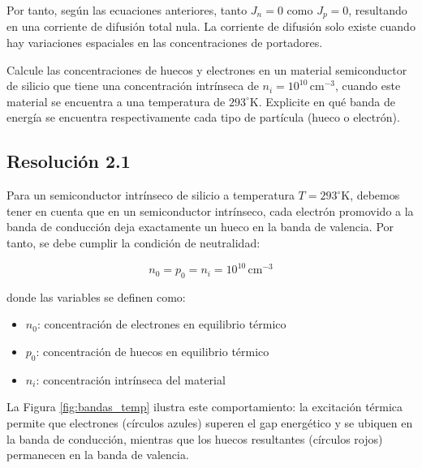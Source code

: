 \documentclass[
  11pt,
  letterpaper,
   addpoints,
  ]{exam}
\begin{document}
\begin{questions}
\begin{solution}
Por tanto, según las ecuaciones anteriores, tanto $J_n = 0$ como $J_p = 0$, resultando en una corriente de difusión total nula. La corriente de difusión solo existe cuando hay variaciones espaciales en las concentraciones de portadores.
\end{solution}

\question
Calcule las concentraciones de huecos y electrones en un material semiconductor de silicio que tiene una concentración intrínseca de $n_i = 10^{10}\,\text{cm}^{-3}$, cuando este material se encuentra a una temperatura de $293^\circ \text{K}$. Explicite en qué banda de energía se encuentra respectivamente cada tipo de partícula (hueco o electrón).
\begin{solution}
    \subsection*{Resolución 2.1}
Para un semiconductor intrínseco de silicio a temperatura $T = 293^\circ$K, debemos tener en cuenta que en un semiconductor intrínseco, cada electrón promovido a la banda de conducción deja exactamente un hueco en la banda de valencia. Por tanto, se debe cumplir la condición de neutralidad:

    \begin{equation}
        n_0 = p_0 = n_i = 10^{10}\,\text{cm}^{-3}
    \end{equation}

    donde las variables se definen como:
    \begin{itemize}
        \item $n_0$: concentración de electrones en equilibrio térmico
        \item $p_0$: concentración de huecos en equilibrio térmico  
        \item $n_i$: concentración intrínseca del material
    \end{itemize}

    La Figura \ref{fig:bandas_temp} ilustra este comportamiento: la excitación térmica permite que electrones (círculos azules) superen el gap energético y se ubiquen en la banda de conducción, mientras que los huecos resultantes (círculos rojos) permanecen en la banda de valencia.


\end{solution}
\end{questions}
\end{document}
